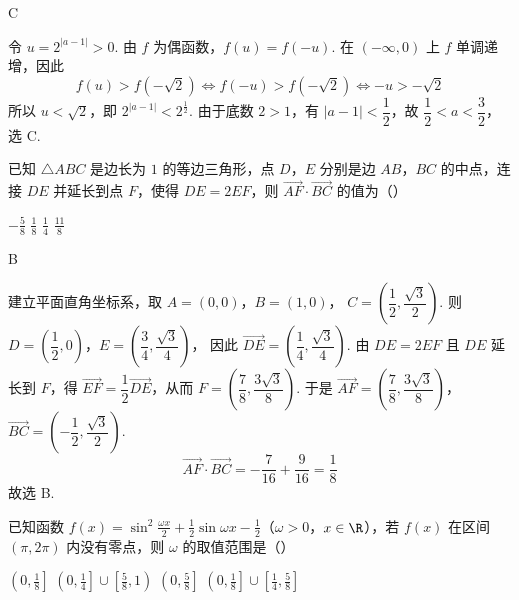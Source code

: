 \begin{answer}
C
\end{answer}

\begin{solution}
令 \(u=2^{|a-1|}>0\). 由 \(f\) 为偶函数，\(f(u)=f(-u)\). 在
\((-\infty,0)\) 上 \(f\) 单调递增，因此
\[
f(u)>f(-\sqrt2)\iff f(-u)>f(-\sqrt2)\iff -u>-\sqrt2
\]
所以 \(u<\sqrt2\)，即
\(2^{|a-1|}<2^{\frac{1}{2}}\). 由于底数 \(2>1\)，有
\(|a-1|<\dfrac12\)，故
\(\dfrac12<a<\dfrac32\)，选 C.
\end{solution}

\begin{problem}
已知 \( \triangle ABC \) 是边长为 \( 1 \) 的等边三角形，点 \(D\)，\(E\) 分别是边 \(AB\)，\(BC\) 的中点，连接 \(DE\) 并延长到点 \(F\)，使得 \( DE=2EF \)，则 \( \overrightarrow{AF}\cdot\overrightarrow{BC} \) 的值为（\quad）

\choices
    {\(-\frac58\)}
    {\(\frac18\)}
    {\(\frac14\)}
    {\(\frac{11}{8}\)}
\end{problem}

\begin{answer}
B
\end{answer}

\begin{solution}
建立平面直角坐标系，取 \(A=(0,0)\)，\(B=(1,0)\)，
\(C=\left(\dfrac12,\dfrac{\sqrt3}{2}\right)\). 则
\(D=\left(\dfrac12,0\right)\)，\(E=\left(\dfrac34,\dfrac{\sqrt3}{4}\right)\)，
因此
\(\overrightarrow{DE}=\left(\dfrac14,\dfrac{\sqrt3}{4}\right)\). 由 \(DE=2EF\) 且 \(DE\) 延长到 \(F\)，得
\(\overrightarrow{EF}=\dfrac12\overrightarrow{DE}\)，从而
\(F=\left(\dfrac78,\dfrac{3\sqrt3}{8}\right)\). 于是
\(\overrightarrow{AF}=\left(\dfrac78,\dfrac{3\sqrt3}{8}\right)\)，\(\overrightarrow{BC}=\left(-\dfrac12,\dfrac{\sqrt3}{2}\right)\).
\[
\overrightarrow{AF}\cdot\overrightarrow{BC}
=-\dfrac{7}{16}+\dfrac{9}{16}=\dfrac18
\]
故选 B.
\end{solution}

\begin{problem}
已知函数 \( f(x)=\sin^2\frac{\omega x}{2}+\frac12\sin\omega x-\frac12 \)（\( \omega>0 \)，\( x\in \R \)），若 \( f(x) \) 在区间 \( \left( \pi,2\pi \right) \) 内没有零点，则 \( \omega \) 的取值范围是（\quad）

\choices
    {\(\left( 0,\frac18 \right]\)}
    {\(\left( 0,\frac14 \right]\cup\left[ \frac58,1 \right)\)}
    {\(\left( 0,\frac58 \right]\)}
    {\(\left( 0,\frac18 \right]\cup\left[ \frac14,\frac58 \right]\)}
\end{problem}

